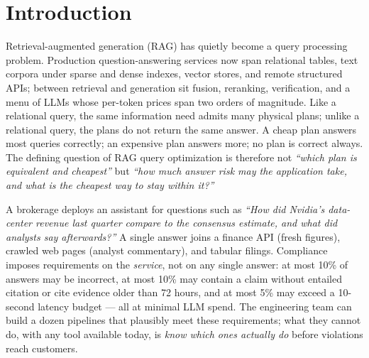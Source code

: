 \section{Introduction}
\label{sec:intro}



Retrieval-augmented generation (RAG) has quietly become a query
processing problem. Production question-answering services now span
relational tables, text corpora under sparse and dense indexes, vector
stores, and remote structured APIs; between retrieval and generation sit
fusion, reranking, verification, and a menu of LLMs whose per-token
prices span two orders of magnitude. Like a relational query, the same
information need admits many physical plans; unlike a relational query,
the plans do not return the same answer. A cheap plan answers most
queries correctly; an expensive plan answers more; no plan is correct
always. The defining question of RAG query optimization is therefore not
\emph{``which plan is equivalent and cheapest''} but \emph{``how much
answer risk may the application take, and what is the cheapest way to
stay within it?''}

\begin{example}
\label{ex:finance}
A brokerage deploys an assistant for questions such as \emph{``How did
Nvidia's data-center revenue last quarter compare to the consensus
estimate, and what did analysts say afterwards?''} A single answer joins
a finance API (fresh figures), crawled web pages (analyst commentary),
and tabular filings. Compliance imposes requirements on the
\emph{service}, not on any single answer: at most 10\% of answers may be
incorrect, at most 10\% may contain a claim without entailed citation or
cite evidence older than 72 hours, and at most 5\% may exceed a
10-second latency budget --- all at minimal LLM spend. The engineering team
can build a dozen pipelines that plausibly meet these requirements; what
they cannot do, with any tool available today, is \emph{know which ones
actually do} before violations reach customers.
\end{example}

